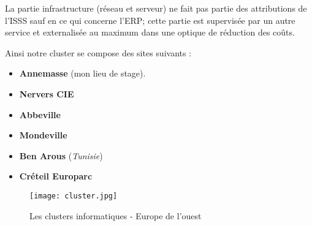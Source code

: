 La partie infrastructure (réseau et serveur) ne fait pas partie des attributions de l'ISSS sauf en ce qui concerne l'ERP; cette partie est supervisée par un autre service et externalisée au maximum dans une optique de réduction des coûts.

Ainsi notre cluster se compose des sites suivants : 

	\begin{itemize}
		\item \textbf{Annemasse} (mon lieu de stage).
		\item \textbf{Nervers CIE}
		\item \textbf{Abbeville}
		\item \textbf{Mondeville}
		\item \textbf{Ben Arous} (\textit{Tunisie})
		\item \textbf{Créteil Europarc}
	\end{itemize}
	
	 \begin{figure}[H]
    	\centering
    \texttt{[image: cluster.jpg]}
	\caption{Les clusters informatiques - Europe de l'ouest}\label{image.cluster} 
\end{figure}

\clearpage
